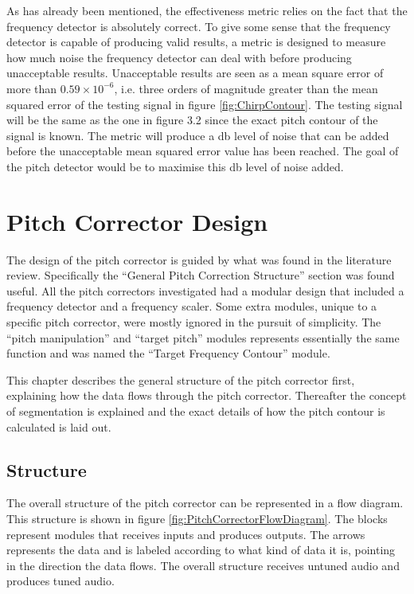 As has already been mentioned, the effectiveness metric relies on the fact that
the frequency detector is absolutely correct. To give some sense that the
frequency detector is capable of producing valid results, a metric is designed to
measure how much noise the frequency detector can deal with before producing
unacceptable results. Unacceptable results are seen as a mean square error of more
than $0.59 \times 10^{-6}$, i.e. three orders of magnitude greater than the mean
squared error of the testing signal in figure \ref{fig:ChirpContour}. The testing
signal will be the  same as the one in figure 3.2 since the exact pitch contour of
the signal is known. The metric will produce a db level of noise that can be added
before the unacceptable mean squared error value has been reached. The goal of the
pitch detector would be to maximise this db level of noise added.

\section{Pitch Corrector Design}

The design of the pitch corrector is guided by what was found in the literature
review. Specifically the ``General Pitch Correction Structure'' section was found
useful. All the pitch correctors investigated had a modular design that included a
frequency detector and a frequency scaler. Some extra modules, unique to a
specific pitch corrector, were mostly ignored in the pursuit of simplicity. The
``pitch manipulation'' and ``target pitch'' modules represents essentially the
same function and was named the ``Target Frequency Contour'' module.

This chapter describes the general structure of the pitch corrector first,
explaining how the data flows through the pitch corrector. Thereafter the concept
of segmentation is explained and the exact details of how the pitch contour is
calculated is laid out.

\subsection{Structure}

The overall structure of the pitch corrector can be represented in a flow diagram.
This structure is shown in figure \ref{fig:PitchCorrectorFlowDiagram}. The blocks
represent modules that receives inputs and produces outputs. The arrows represents
the data and is labeled according to what kind of data it is, pointing in the
direction the data flows. The overall structure receives untuned audio and
produces tuned audio.

